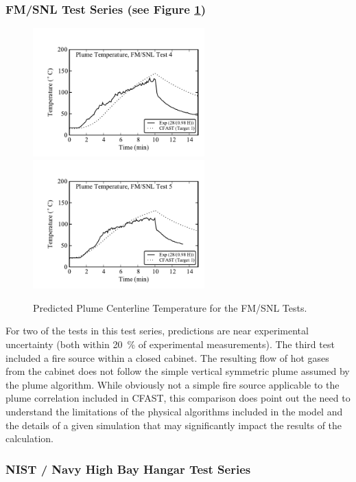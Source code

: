 \subsubsection{FM/SNL Test Series (see Figure \ref{fig:FM_SNL_Plume})}

\begin{figure}[p]
\begin{center}
\includegraphics[width=2.6in]{FIGURES/FM_SNL/FM_SNL_04_Plume_Temperature} \\
\includegraphics[width=2.6in]{FIGURES/FM_SNL/FM_SNL_05_Plume_Temperature} 
\end{center}
\caption{Predicted Plume Centerline Temperature for the FM/SNL Tests.} \label{fig:FM_SNL_Plume}
\end{figure}

For two of the tests in this test series, predictions are near experimental uncertainty (both within 20~\% of experimental measurements). The third test included a fire source within a closed cabinet.  The resulting flow of hot gases from the cabinet does not follow the simple vertical symmetric plume assumed by the plume algorithm.  While obviously not a simple fire source applicable to the plume correlation included in CFAST, this comparison does point out the need to understand the limitations of the physical algorithms included in the model and the details of a given simulation that may significantly impact the results of the calculation.

\subsubsection{NIST / Navy High Bay Hangar Test Series}

